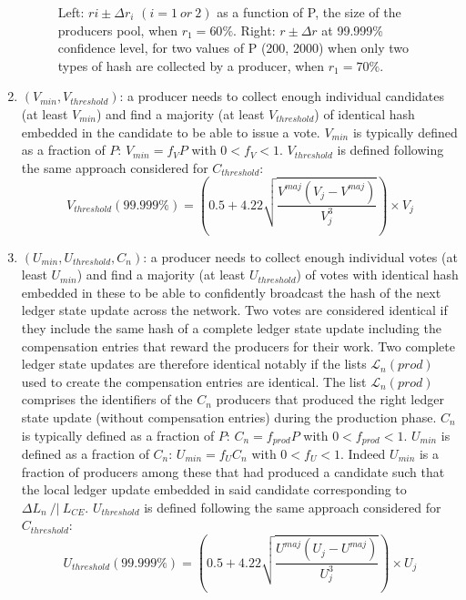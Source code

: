 \begin{enumerate}
\begin{figure}[H]
\begin{subfigure}[b]{0.45\textwidth}
        \label{fig:rdeltara}
    \end{subfigure}
    \vspace*{-0.2in}
    \caption{Left: $ri \pm \Delta r_i$ $(i=1~or~2)$ as a function of P, the size of the producers pool, when $r_1 = 60\%$. Right: $r \pm \Delta r$ at 99.999\% confidence level, for two values of P (200, 2000) when only two types of hash are collected by a producer, when $r_1 = 70\%$.}
    \label{fig:rdeltar}
\end{figure}


\item $(V_{min}, V_{threshold})$: a producer needs to collect enough individual candidates (at least $V_{min}$) and find a majority (at least $V_{threshold}$) of identical hash embedded in the candidate to be able to issue a vote. 
$V_{min}$ is typically defined as a fraction of $P$: $V_{min} = f_V P$ with $0 < f_V < 1$. $V_{threshold}$ is defined following the same approach considered for $C_{threshold}$: 
 \begin{equation}
 V_{threshold}(99.999\%) = \left( 0.5 + 4.22\sqrt{\frac{V^{maj}(V_j-V^{maj})}{V_j^3}} \right) \times V_j
 \end{equation}
 
 \item $(U_{min}, U_{threshold}, C_n)$: a producer needs to collect enough individual votes (at least $U_{min}$) and find a majority (at least $U_{threshold}$) of votes with identical hash embedded in these to be able to confidently broadcast the hash of the next ledger state update across the network. Two votes are considered identical if they include the same hash of a complete ledger state update including the compensation entries that reward the producers for their work. Two complete ledger state updates are therefore identical notably if the lists $\mathcal{L}_{n}(prod)$ used to create the compensation entries are identical. The list $\mathcal{L}_{n}(prod)$ comprises the identifiers of the $C_n$ producers that produced the right ledger state update (without compensation entries) during the production phase. $C_{n}$ is typically defined as a fraction of $P$: $C_{n} = f_{prod}P$ with $0 < f_{prod} < 1$.
 $U_{min}$ is defined as a fraction of $C_n$: $U_{min} = f_U C_n$ with $0 < f_U < 1$. Indeed $U_{min}$ is a fraction of producers among these that had produced a candidate such that the local ledger update embedded in said candidate corresponding to $\Delta L_n~/|~L_{CE}$. $U_{threshold}$ is defined following the same approach considered for $C_{threshold}$: 
 \begin{equation}
 U_{threshold}(99.999\%) = \left( 0.5 +  4.22\sqrt{\frac{U^{maj}(U_j-U^{maj})}{U_j^3}} \right) \times U_j
 \end{equation}

\end{enumerate}

